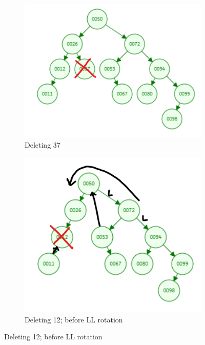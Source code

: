 \documentclass[12pt, a4paper]{article}
\begin{document}
\begin{enumerate}
\begin{enumerate}
      \begin{figure}[h!]
        \begin{subfigure}[b]{0.3\textwidth}
          \centering
          \includegraphics[width=\textwidth]{2-2-a}
          \caption{Deleting 37}
          \label{fig:2-2-a}
        \end{subfigure}
        \hfill
        \begin{subfigure}[b]{0.3\textwidth}
          \centering
          \includegraphics[width=\textwidth]{2-2-b}
          \caption{Deleting 12; before LL rotation}
          \label{fig:2-2-b}

\end{subfigure}
\end{figure}
\end{enumerate}
\end{enumerate}
\end{document}
